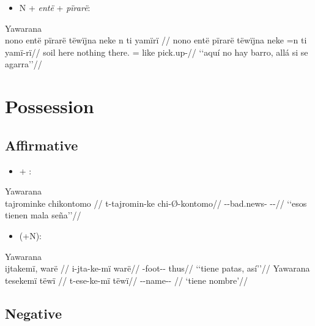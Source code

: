 \documentclass{memoir}
\begin{document}
\begin{itemize}
\tightlist
\item
  N + \emph{entë} + \emph{pïrarë}:
\end{itemize}

\ex Yawarana \\
\label{histyarirdi-823}    \begingl
    \glpreamble nono entë pïrarë tëwïjna neke n ti yamïrï //
    \gla nono entë pïrarë tëwïjna neke =n ti yamï-rï//
    \glb soil here nothing there.  = like pick.up-//
        \glft ‘‘aquí no hay barro, allá si se agarra’’//  
    \endgl 
\xe

\section{Possession}

\subsection{Affirmative}

\begin{itemize}
\tightlist
\item
   + :
\end{itemize}

\ex Yawarana \\
\label{convfemgrme-146}    \begingl
    \glpreamble tajrominke chikontomo //
    \gla t-tajromin-ke chi-Ø-kontomo//
    \glb --bad.news- --//
        \glft ‘‘esos tienen mala seña’’//  
    \endgl 
\xe

\begin{itemize}
\tightlist
\item
   (+N):
\end{itemize}

\pex\label{}    \a Yawarana\\
    \label{convinsectmaj-24}        \begingl
        \glpreamble ijtakemï, warë //
        \gla i-jta-ke-mï warë//
        \glb {}-foot-- thus//
            \glft ‘‘tiene patas, así’’//  
        \endgl 
    \a Yawarana\\
    \label{ctorosq-47}        \begingl
        \glpreamble tesekemï tëwï //
        \gla t-ese-ke-mï tëwï//
        \glb --name-- //
            \glft ‘tiene nombre’//  
        \endgl 
\xe

\subsection{Negative}
\end{document}
